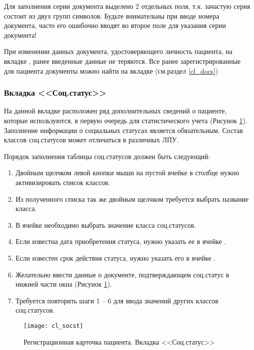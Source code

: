 \begin{vnim}
Для заполнения серии документа выделено 2 отдельных поля, т.к. зачастую серия состоит из двух групп символов. Будьте внимательны при вводе номера документа, часто его ошибочно вводят во второе поле для указания серии документа!
\end{vnim}
  
\begin{prim}
При изменении данных документа, удостоверяющего личность пациента, на вкладке , ранее введенные данные не теряются. Все ранее зарегистрированные для пациента документы можно найти на вкладке  (см.раздел \ref{cl_docs})
\end{prim}

\subsubsection{Вкладка <<Соц.статус>>} \label{cl_socst}

На данной вкладке расположен ряд дополнительных сведений о пациенте, которые используются, в первую очередь для статистического учета (Рисунок \ref{img_cl_socst}). Заполнение информации о социальных статусах является обязательным. Состав классов соц.статусов может отличаться в различных ЛПУ.

Порядок заполнения таблицы соц.статусов должен быть следующий:
\begin{enumerate}
 \item Двойным щелчком левой кнопки мыши на пустой ячейке в столбце  нужно активизировать список классов.
 \item Из полученного списка так же двойным щелчком требуется выбрать название класса.
 \item В ячейке  необходимо выбрать значение класса соц.статусов.
 \item Если известна дата приобретения статуса, нужно указать ее в ячейке .
 \item Если известен срок действия статуса, нужно указать его в ячейке .
 \item Желательно ввести данные о документе, подтверждающем соц.статус в нижней части окна (Рисунок \ref{img_cl_socst}).
 \item Требуется повторить шаги 1 – 6 для ввода значений других классов соц.статусов.
\end{enumerate}

\begin{figure}[ht]\centering
 \texttt{[image: cl\_socst]}
 \caption{Регистрационная карточка пациента. Вкладка <<Соц.статус>>}
 \label{img_cl_socst}
\end{figure} 

